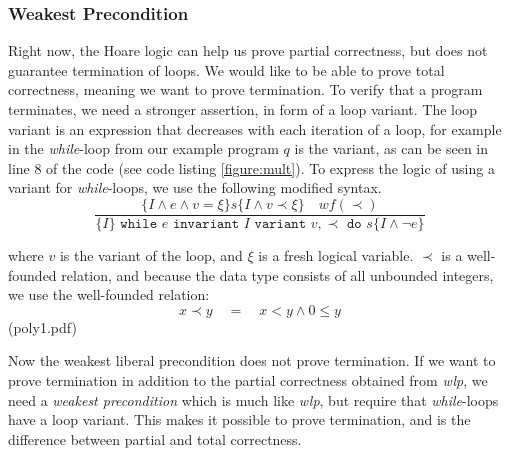 \subsubsection{Weakest Precondition}
Right now, the Hoare logic can help us prove partial correctness, but does not guarantee termination of loops. We would like to be able to prove total correctness, meaning we want to prove termination. To verify that a program terminates, we need a stronger assertion, in form of a loop variant.
The loop variant is an expression that decreases with each iteration of a loop, for example in the \textit{while}-loop from our example program $q$ is the variant, as can be seen in line 8 of the code (see code listing \autoref{figure:mult}).
To express the logic of using a variant for \textit{while}-loops, we use the following modified syntax.
$$
	\frac{
		\{I \land e \land v = \xi \} s \{I \land v \prec \xi \} \quad wf(\prec)
	}{
		\{I\} \texttt{ while } e \texttt{ invariant } I 
          \texttt{ variant } v, \prec \texttt{ do } s \{I \land \neg e\}
	}
$$

where $v$ is the variant of the loop, and $\xi$ is a fresh logical variable. $\prec$ is a well-founded relation, and because the data type consists of all unbounded integers, we use the well-founded relation:
$$x \prec y \quad = \quad x < y \land 0 \leq y $$
(poly1.pdf)

Now the weakest liberal precondition does not prove termination. If we want to prove termination in addition to the partial correctness obtained from \textit{wlp}, we need a \textit{weakest precondition} which is much like \textit{wlp}, but require that \textit{while}-loops have a loop variant. 
This makes it possible to prove termination, and is the difference between partial and total correctness.

